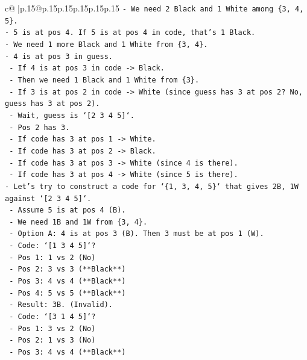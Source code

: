 \documentclass{article}
\begin{document}
{\begin{supertabular}{c@{$\;$}|p{.15\linewidth}@{}p{.15\linewidth}p{.15\linewidth}p{.15\linewidth}p{.15\linewidth}p{.15\linewidth}}
{{{\texttt{{-} We need 2 Black and 1 White among \{3, 4, 5\}.} \\
\texttt{{-} 5 is at pos 4. If 5 is at pos 4 in code, that's 1 Black.} \\
\texttt{{-} We need 1 more Black and 1 White from \{3, 4\}.} \\
\texttt{{-} 4 is at pos 3 in guess.} \\
\texttt{  {-} If 4 is at pos 3 in code {-}> Black.} \\
\texttt{  {-} Then we need 1 Black and 1 White from \{3\}.} \\
\texttt{  {-} If 3 is at pos 2 in code {-}> White (since guess has 3 at pos 2? No, guess has 3 at pos 2).} \\
\texttt{    {-} Wait, guess is `{[}2 3 4 5{]}`.} \\
\texttt{    {-} Pos 2 has 3.} \\
\texttt{    {-} If code has 3 at pos 1 {-}> White.} \\
\texttt{    {-} If code has 3 at pos 2 {-}> Black.} \\
\texttt{    {-} If code has 3 at pos 3 {-}> White (since 4 is there).} \\
\texttt{    {-} If code has 3 at pos 4 {-}> White (since 5 is there).} \\
\texttt{{-} Let's try to construct a code for `\{1, 3, 4, 5\}` that gives 2B, 1W against `{[}2 3 4 5{]}`.} \\
\texttt{  {-} Assume 5 is at pos 4 (B).} \\
\texttt{  {-} We need 1B and 1W from \{3, 4\}.} \\
\texttt{  {-} Option A: 4 is at pos 3 (B). Then 3 must be at pos 1 (W).} \\
\texttt{    {-} Code: `{[}1 3 4 5{]}`?} \\
\texttt{      {-} Pos 1: 1 vs 2 (No)} \\
\texttt{      {-} Pos 2: 3 vs 3 (**Black**)} \\
\texttt{      {-} Pos 3: 4 vs 4 (**Black**)} \\
\texttt{      {-} Pos 4: 5 vs 5 (**Black**)} \\
\texttt{      {-} Result: 3B. (Invalid).} \\
\texttt{    {-} Code: `{[}3 1 4 5{]}`?} \\
\texttt{      {-} Pos 1: 3 vs 2 (No)} \\
\texttt{      {-} Pos 2: 1 vs 3 (No)} \\
\texttt{      {-} Pos 3: 4 vs 4 (**Black**)} \\
}}}
\end{supertabular}}
\end{document}
